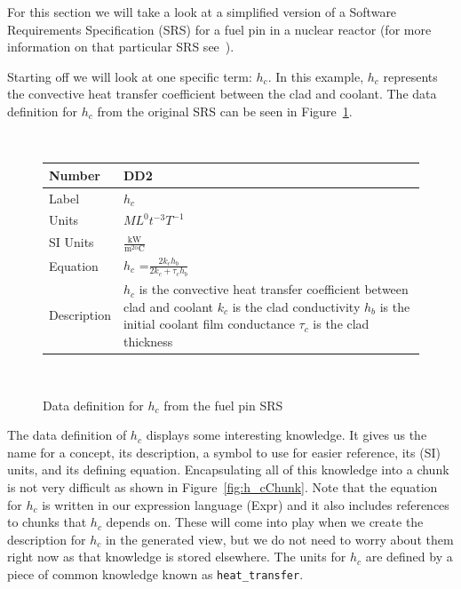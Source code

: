 \documentclass[preprint, 10pt]{sigplanconf}
\newcommand{\colAwidth}{0.1\textwidth}
\newcommand{\colBwidth}{0.34\textwidth}
\begin{document}
For this section we will take a look at a simplified version of a Software
Requirements Specification (SRS) for a fuel pin in a nuclear reactor (for more
information on that particular SRS see~\cite{SmithAndKoothoor2016}).

Starting off we will look at one specific term: $h_c$. In this example, $h_c$
represents the convective heat transfer coefficient between the clad and
coolant. The data definition for $h_c$ from the original SRS can be seen in
Figure~\ref{fig:h_c}.

\begin{figure}
~\newline \noindent \begin{minipage}{\textwidth}
\begin{tabular}{p{\colAwidth} p{\colBwidth}}
\toprule \textbf{Number} & \textbf{DD2 \label{hc}}
\\ \midrule 
Label & 
$h_{c}$
\\ \midrule
Units & $ML^0t^{-3}T^{-1}$\\ \midrule
SI Units & $\mathrm{\frac{kW}{m^{2o}C}}$\\ \midrule
Equation & $h_{c}$ =$
\frac{2k_{c}h_{b}}{2k_{c}+\tau_{c}h_{b}}$\\ \midrule
Description & $h_{c}$ is the convective heat transfer coefficient between clad
and coolant
\newline
$k_{c}$ is the
clad conductivity \newline
$h_{b}$ is the
initial coolant film conductance \newline
$\tau_{c}$ is the
clad thickness 
\newline
\end{tabular} \end{minipage}\\ 
\caption{Data definition for $h_c$ from the fuel pin SRS}
\label{fig:h_c}
\end{figure}

The data definition of $h_c$ displays some interesting knowledge. It gives us
the name for a concept, its description, a symbol to use for easier reference,
its (SI) units, and its defining equation. Encapsulating all of this knowledge
into a chunk is not very difficult as shown in Figure~\ref{fig:h_cChunk}. Note
that the equation for $h_c$ is written in our expression language (Expr) and it
also includes references to chunks that $h_c$ depends on. These will come into
play when we create the description for $h_c$ in the generated view, but we do
not need to worry about them right now as that knowledge is stored elsewhere.
The units for $h_c$ are defined by a piece of common knowledge known as
\verb|heat_transfer|.
\end{document}
